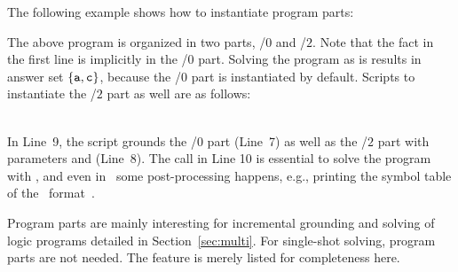 \begin{example}
The following example shows how to instantiate program parts:

The above program is organized in two parts, /$0$ and /$2$.
Note that the fact in the first line is implicitly in the /$0$ part.
Solving the program as is results in answer set $\{\texttt{a}, \texttt{c}\}$,
because the /$0$ part is instantiated by default.
Scripts to instantiate the /$2$ part as well are as follows:%
%
\\[-8pt] %
\begin{minipage}[t]{0.51\textwidth}

\end{minipage}
\begin{minipage}[t]{0.51\textwidth}

\end{minipage}\\
%
In Line~9,
the script grounds the /$0$ part (Line~7)
as well as the /$2$ part with parameters  and  (Line~8).
The call in Line 10 is essential to solve the program with \clingo,
and even in \gringo\ some post-processing happens, e.g.,
printing the symbol table of the \smodels\ format~\cite{lparseManual}.
\end{example}

\begin{note}
Program parts are mainly interesting for incremental grounding and solving of logic programs detailed in Section~\ref{sec:multi}.
For single-shot solving, program parts are not needed.
The feature is merely listed for completeness here.
\end{note}


